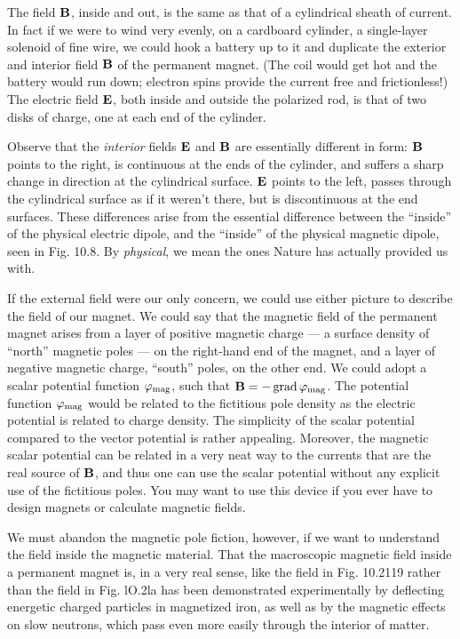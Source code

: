 The field $\mathbf{B}$, inside and out, is the same as that of a cylindrical
sheath of current. In fact if we were to wind very evenly, on a cardboard
cylinder, a single-layer solenoid of fine wire, we could hook
a battery up to it and duplicate the exterior and interior field $\mathbf{B}$ of
the permanent magnet. (The coil would get hot and the battery
would run down; electron spins provide the current free and 
frictionless!) The electric field $\mathbf{E}$, both inside and outside the polarized rod,
is that of two disks of charge, one at each end of the cylinder.

Observe that the \emph{interior} fields $\mathbf{E}$ and $\mathbf{B}$ are essentially different
in form: $\mathbf{B}$ points to the right, is continuous at the ends of the
cylinder, and suffers a sharp change in direction at the cylindrical
surface. $\mathbf{E}$ points to the left, passes through the cylindrical surface
as if it weren't there, but is discontinuous at the end surfaces. These
differences arise from the essential difference between the ``inside''
of the physical electric dipole, and the ``inside'' of the physical magnetic
dipole, seen in Fig. 10.8. By \emph{physical}, we mean the ones
Nature has actually provided us with.

If the external field were our only concern, we could use either
picture to describe the field of our magnet. We could say that the
magnetic field of the permanent magnet arises from a layer of positive
magnetic charge --- a surface density of ``north'' magnetic poles --- 
on the right-hand end of the magnet, and a layer of negative magnetic
charge, ``south'' poles, on the other end. We could adopt a scalar
potential function $\varphi_\text{mag}$, such that $\mathbf{B} =  -\operatorname{grad} \varphi_\text{mag}$. The potential
function $\varphi_\text{mag}$ would be related to the fictitious pole density as the
electric potential is related to charge density. The simplicity of the
scalar potential compared to the vector potential is rather appealing.
Moreover, the magnetic scalar potential can be related in a very neat
way to the currents that are the real source of $\mathbf{B}$, and thus one can use
the scalar potential without any explicit use of the fictitious poles.
You may want to use this device if you ever have to design magnets
or calculate magnetic fields.

We must abandon the magnetic pole fiction, however, if we want
to understand the field inside the magnetic material. That the
macroscopic magnetic field inside a permanent magnet is, in a very
real sense, like the field in Fig. 10.2119 rather than the field in
Fig. lO.2la has been demonstrated experimentally by deflecting
energetic charged particles in magnetized iron, as well as by the magnetic
effects on slow neutrons, which pass even more easily through
the interior of matter.

